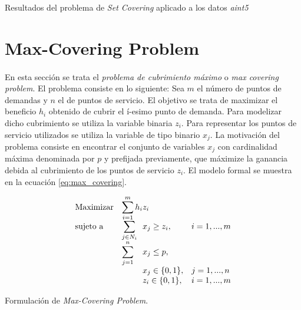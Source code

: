 \documentclass[spanish]{article}
\begin{document}
			\begin{table}[h]
				\begin{center}
				\end{center}
				\caption{Resultados del problema de \emph{Set Covering} aplicado a los datos \emph{aint5}}
				\label{table:sol-6.2b3}
			\end{table}

	\section{Max-Covering Problem}
	\label{sec:e-7}

		\paragraph{}
		En esta sección se trata el \emph{problema de cubrimiento máximo} o \emph{max covering problem}. El problema consiste en lo siguiente: Sea $m$ el número de puntos de demandas y $n$ el de puntos de servicio. El objetivo se trata de maximizar el beneficio $h_i$ obtenido de cubrir el í-esimo punto de demanda. Para modelizar dicho cubrimiento se utiliza la variable binaria $z_i$. Para representar los puntos de servicio utilizados se utiliza la variable de tipo binario $x_j$. La motivación del problema consiste en encontrar el conjunto de variables $x_j$ con cardinalidad máxima denominada por $p$ y prefijada previamente, que máximize la ganancia debida al cubrimiento de los puntos de servicio $z_i$. El modelo formal se muestra en la ecuación \eqref{eq:max_covering}.

		\begin{eqfloat}
			\begin{equation}
				\begin{array}{ll@{}ll}
					\text{Maximizar}
						& \displaystyle\sum\limits_{i = 1}^{m} h_{i} & z_{i} 			&							\\
					\text{sujeto a}
						& \displaystyle\sum\limits_{j \in N_i}& x_{j} \geq z_i,		&i=1 ,..., m	\\
						& \displaystyle\sum\limits_{j = 1}^n 	& x_{j} \leq p,  		& 						\\
						&                                     &	x_{j} \in \{0,1\},&j=1 ,..., n 	\\
						&                                     &	z_{i} \in \{0,1\},&i=1 ,..., m  \\
				\end{array}
			\end{equation}
			\caption{Formulación de \emph{Max-Covering Problem}.}
			\label{eq:max_covering}
		\end{eqfloat}
\end{document}
